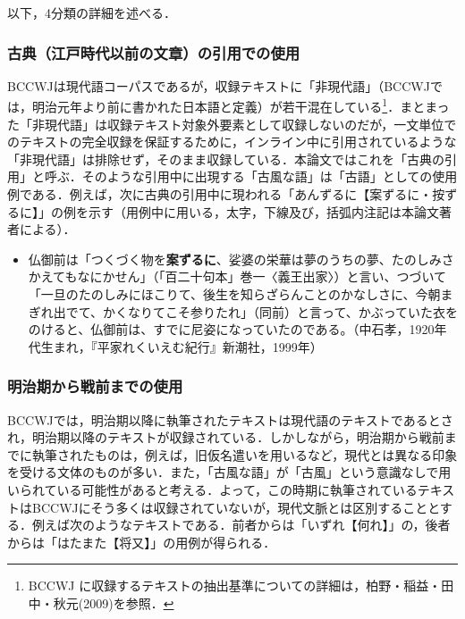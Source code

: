 \documentclass[japanese]{jnlp_1.4}
\begin{document}
以下，4分類の詳細を述べる．


\subsubsection{古典（江戸時代以前の文章）の引用での使用}

BCCWJは現代語コーパスであるが，収録テキストに「非現代語」（BCCWJでは，明治元年より前に書かれた日本語と定義）が若干混在している\footnote{BCCWJ に収録するテキストの抽出基準についての詳細は，柏野・稲益・田中・秋元(2009)を参照．}．まとまった「非現代語」は収録テキスト対象外要素として収録しないのだが，一文単位でのテキストの完全収録を保証するために，インライン中に引用されているような「非現代語」は排除せず，そのまま収録している．本論文ではこれを「古典の引用」と呼ぶ．そのような引用中に出現する「古風な語」は「古語」としての使用例である．例えば，次に古典の引用中に現われる「あんずるに【案ずるに・按ずるに】」の例を示す（用例中に用いる，太字，下線及び，括弧内注記は本論文著者による）．

\begin{itemize}
\item
仏御前は「つくづく物を\textbf{案ずるに}、娑婆の栄華は夢のうちの夢、たのしみさかえてもなにかせん」（「百二十句本」巻一〈義王出家〉）と言い、つづいて「一旦のたのしみにほこりて、後生を知らざらんことのかなしさに、今朝まぎれ出でて、かくなりてこそ参りたれ」（同前）と言って、かぶっていた衣をのけると、仏御前は、すでに尼姿になっていたのである。（中石孝，1920年代生まれ，『平家れくいえむ紀行』新潮社，1999年）
\end{itemize}

\subsubsection{明治期から戦前までの使用}

BCCWJでは，明治期以降に執筆されたテキストは現代語のテキストであるとされ，明治期以降のテキストが収録されている．しかしながら，明治期から戦前までに執筆されたものは，例えば，旧仮名遣いを用いるなど，現代とは異なる印象を受ける文体のものが多い．また，「古風な語」が「古風」という意識なしで用いられている可能性があると考える．よって，この時期に執筆されているテキストはBCCWJにそう多くは収録されていないが，現代文脈とは区別することとする．例えば次のようなテキストである．前者からは「いずれ【何れ】」の，後者からは「はたまた【将又】」の用例が得られる．
\end{document}
